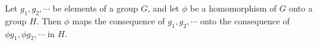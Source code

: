 Let $g_1, g_2, \cdots$ be elements of a group $G$, and let $\phi$ be a homomorphism of $G$ onto a group $H$. Then $\phi$ maps the consequence of $g_1, g_2, \cdots$ onto the consequence of $\phi g_1, \phi g_2, \cdots$ in $H$.
